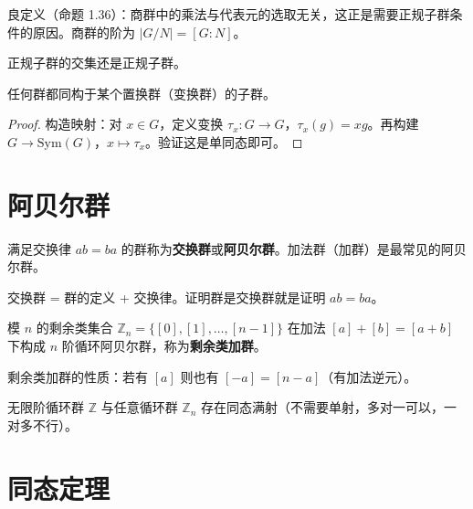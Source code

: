 \begin{note}
良定义（命题 1.36）：商群中的乘法与代表元的选取无关，这正是需要正规子群条件的原因。商群的阶为 $|G/N| = [G:N]$。
\end{note}

\begin{proposition}[命题 1.38]
正规子群的交集还是正规子群。
\end{proposition}

\begin{theorem}[凯莱定理]
任何群都同构于某个置换群（变换群）的子群。
\end{theorem}

\begin{proof}
构造映射：对 $x \in G$，定义变换 $\tau_x\colon G \to G$，$\tau_x(g) = xg$。再构建 $G \to \mathrm{Sym}(G)$，$x \mapsto \tau_x$。验证这是单同态即可。
\end{proof}

\section{阿贝尔群}

\begin{definition}
满足交换律 $ab = ba$ 的群称为\textbf{交换群}或\textbf{阿贝尔群}。加法群（加群）是最常见的阿贝尔群。
\end{definition}

\begin{note}
交换群 = 群的定义 + 交换律。证明群是交换群就是证明 $ab = ba$。
\end{note}

\begin{definition}[剩余类加群]
模 $n$ 的剩余类集合 $\mathbb{Z}_n = \{[0], [1], \ldots, [n-1]\}$ 在加法 $[a] + [b] = [a+b]$ 下构成 $n$ 阶循环阿贝尔群，称为\textbf{剩余类加群}。
\end{definition}

\begin{note}
剩余类加群的性质：若有 $[a]$ 则也有 $[-a] = [n-a]$（有加法逆元）。
\end{note}

\begin{proposition}[无限阶的群与循环群同态]
无限阶循环群 $\mathbb{Z}$ 与任意循环群 $\mathbb{Z}_n$ 存在同态满射（不需要单射，多对一可以，一对多不行）。
\end{proposition}

\section{同态定理}

